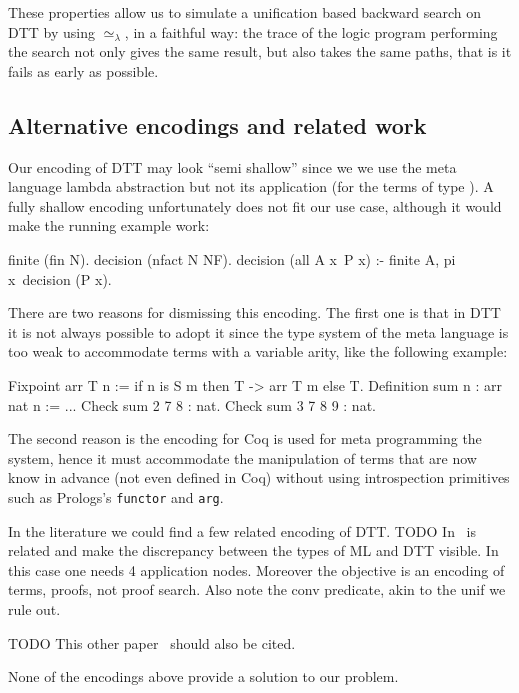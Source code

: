 \documentclass[sigconf,natbib=false]{acmart}
\newcommand{\UnifRel}{\ensuremath{\simeq}}
\newcommand{\Ue}{\ensuremath{\UnifRel_\lambda}\xspace}
\begin{document}
These properties allow us to simulate a unification based
backward search on DTT by using \Ue, in a faithful way:
the trace of the logic program
performing the search not only gives the same result, but
also takes the same paths, that is it fails as early as possible.


\subsection{Alternative encodings and related work}


Our encoding of DTT may look ``semi shallow'' since we we use the meta language
lambda abstraction but not its application (for the terms of type ).
A fully shallow encoding unfortunately does not fit our use case, although
it would make the running example work:

\begin{elpicode}
finite (fin N).
decision (nfact N NF).
decision (all A x\ P x) :- finite A, pi x\ decision (P x).
\end{elpicode}

\noindent
There are two reasons for dismissing this encoding. The first one is that
in DTT it is not always possible to adopt it since the type system
of the meta language is too weak to accommodate terms with a variable arity,
like the following example:

\begin{coqcode}
Fixpoint arr T n := if n is S m then T -> arr T m else T.
Definition sum n : arr nat n := ...
Check sum 2   7 8   : nat.
Check sum 3   7 8 9 : nat.
\end{coqcode}

\noindent
The second reason is the encoding for Coq is used for meta programming the
system, hence it must accommodate the manipulation of terms that are now
know in advance (not even defined in Coq) without using introspection
primitives such as Prologs's \texttt{functor} and \texttt{arg}.

In the literature we could find a few related encoding of DTT.
TODO In~\cite{felty93lics} is related and make the
discrepancy between the types of ML and DTT visible. In this case
one needs 4 application nodes. Moreover the objective is an encoding
of terms, proofs, not proof search. Also note the conv predicate,
akin to the unif we rule out.

TODO This other paper~\cite{10.1007/978-3-031-38499-8_25} should also be cited.

None of the encodings above provide a solution to our problem.
\end{document}
